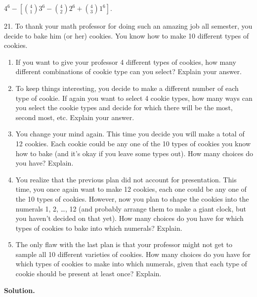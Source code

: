\documentclass[10pt,]{book}
\theoremstyle{plain}
\theoremstyle{definition}
\theoremstyle{definition}
\theoremstyle{definition}
\numberwithin{equation}{section}
\begin{document}
\begin{exerciselist}
            \(4^6 - \left[{4 \choose 1}3^6 - {4 \choose 2}2^6 + {4 \choose 3} 1^6 \right]\).
\item[21.]\hypertarget{exr_cookie-counting}{}
            To thank your math professor for doing such an amazing job all semester, you decide to bake him (or her) cookies. You know how to make 10 different types of cookies.
          \leavevmode%
\begin{enumerate}[label=(\alph*)]
\item\hypertarget{li-761}{}
                If you want to give your professor 4 different types of cookies, how many different combinations of cookie type can you select? Explain your answer.
\item\hypertarget{li-762}{}
                To keep things interesting, you decide to make a different number of each type of cookie. If again you want to select 4 cookie types, how many ways can you select the cookie types and decide for which there will be the most, second most, etc. Explain your answer.
\item\hypertarget{li-763}{}
                You change your mind again. This time you decide you will make a total of 12 cookies. Each cookie could be any one of the 10 types of cookies you know how to bake (and it's okay if you leave some types out). How many choices do you have? Explain.
\item\hypertarget{li-764}{}
                You realize that the previous plan did not account for presentation. This time, you once again want to make 12 cookies, each one could be any one of the 10 types of cookies. However, now you plan to shape the cookies into the numerals 1, 2,
                \dots{}, 12 (and probably arrange them to make a giant clock, but you haven't decided on that yet). How many choices do you have for which types of cookies to bake into which numerals? Explain.
\item\hypertarget{li-765}{}
                The only flaw with the last plan is that your professor might not get to sample all 10 different varieties of cookies. How many choices do you have for which types of cookies to make into which numerals, given that each type of cookie should be present at least once? Explain.
\end{enumerate}

\par\smallskip
\par\smallskip
\noindent\textbf{Solution.}\hypertarget{solution-173}{}\quad


\end{exerciselist}
\end{document}
